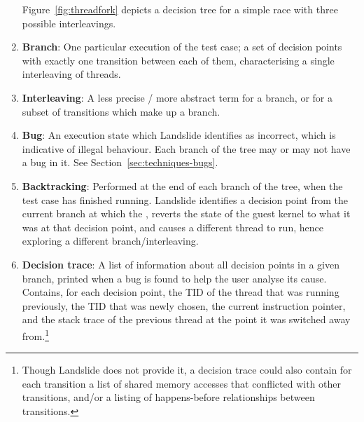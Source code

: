 \begin{enumerate}
		Figure~\ref{fig:threadfork} depicts a decision tree for a simple race with three possible interleavings.
	\item {\bf Branch}:
		One particular execution of the test case; a set of decision points with exactly one transition between each of them, characterising a single interleaving of threads.
	\item {\bf Interleaving}:
		A less precise / more abstract term for a branch, or for a subset of transitions which make up a branch.
	\item {\bf Bug}: An execution state which Landslide identifies as incorrect, which is indicative of illegal behaviour. Each branch of the tree may or may not have a bug in it. See Section~\ref{sec:techniques-bugs}.
	\item {\bf Backtracking}:
		Performed at the end of each branch of the tree, when the test case has finished running. Landslide identifies a decision point from the current branch at which the , reverts the state of the guest kernel to what it was at that decision point, and causes a different thread to run, hence exploring a different branch/interleaving.
	\item {\bf Decision trace}:
		A list of information about all decision points in a given branch, printed when a bug is found to help the user analyse its cause. Contains, for each decision point, the TID of the thread that was running previously, the TID that was newly chosen, the current instruction pointer, and the stack trace of the previous thread at the point it was switched away from.\footnote{Though Landslide does not provide it, a decision trace could also contain for each transition a list of shared memory accesses that conflicted with other transitions, and/or a listing of happens-before relationships between transitions.}
\end{enumerate}

